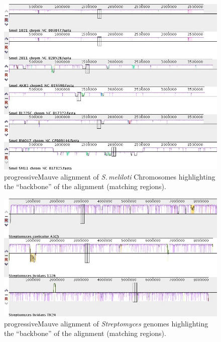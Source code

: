 \documentclass[12pt]{article}
\newcommand{\smel}{\textit{S.\,meliloti}\xspace}
\newcommand{\p}{progressiveMauve\xspace}
\newcommand{\strep}{\textit{Streptomyces}\xspace}
\begin{document}
\begin{figure}
	\includegraphics[width=0.9\linewidth]{./sinoC_Mauve_alignment_pic_26Mar20.jpg}
	\caption{\label{fig:sinoC_mauve}\p alignment of \smel Chromosomes highlighting the ``backbone'' of the alignment (matching regions).}
\end{figure}

\begin{figure}
	\includegraphics[width=0.9\linewidth]{./strep_mauve_backbone_aln_pic_27Mar20.jpg}
	\caption{\label{fig:strep_mauve}\p alignment of \strep genomes highlighting the ``backbone'' of the alignment (matching regions).}
\end{figure}
\end{document}
